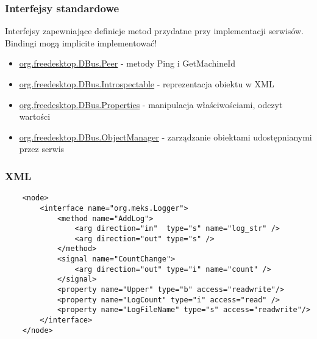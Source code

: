 

\begin{frame}
    \frametitle{Interfejsy standardowe}
    Interfejsy zapewniające definicje metod 
    przydatne przy implementacji serwisów.
    Bindingi mogą implicite implementować!
    \begin{itemize}
        \item \href{https://dbus.freedesktop.org/doc/dbus-java/api/org/freedesktop/DBus.Peer.html}{org.freedesktop.DBus.Peer} - metody Ping i GetMachineId \pause
        \item \href{https://dbus.freedesktop.org/doc/dbus-java/api/org/freedesktop/DBus.Introspectable.html}{org.freedesktop.DBus.Introspectable} - reprezentacja obiektu w XML \pause
        \item \href{https://dbus.freedesktop.org/doc/dbus-java/api/org/freedesktop/DBus.Properties.html}{org.freedesktop.DBus.Properties} - manipulacja właściwościami, odczyt wartości \pause
        \item \href{URL}{org.freedesktop.DBus.ObjectManager} - zarządzanie obiektami udostępnianymi przez serwis
    \end{itemize}
\end{frame}


\begin{frame}[fragile]
    \frametitle{XML}
    \lstset{
    basicstyle=\tiny\ttfamily, 
    breaklines=true,           
    breakatwhitespace=true,    
    stepnumber=1               
}
    \begin{lstlisting}
    <node>
        <interface name="org.meks.Logger">
            <method name="AddLog">
                <arg direction="in"  type="s" name="log_str" />
                <arg direction="out" type="s" />
            </method>
            <signal name="CountChange">
                <arg direction="out" type="i" name="count" />
            </signal>
            <property name="Upper" type="b" access="readwrite"/>
            <property name="LogCount" type="i" access="read" />
            <property name="LogFileName" type="s" access="readwrite"/>
        </interface>
    </node>

    \end{lstlisting}
\end{frame}


